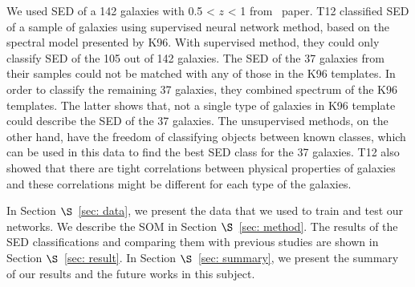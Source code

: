 We used SED of a 142 galaxies with 0.5 < $z$ < 1 from~\citet[][hereafter T12]{Hossein12} paper.
T12 classified SED of a sample of galaxies using supervised neural network method, based on the spectral model presented by K96.
With supervised method, they could only classify SED of the 105 out of 142 galaxies.
The SED of the 37 galaxies from their samples could not be matched with any of those in the K96 templates. 
In order to classify the remaining 37 galaxies, they combined spectrum of the K96 templates.
The latter shows that, not a single type of galaxies in K96 template could describe the SED of the 37 galaxies.
The unsupervised methods, on the other hand, have the freedom of classifying objects between known classes, which can be used in this data to find the best SED class for the 37 galaxies.
T12 also showed that there are tight correlations between physical properties of galaxies and these correlations might be different for each type of the galaxies.

 In Section $\S$~\ref{sec: data}, we present the data that we used to train and test our networks. We describe the SOM in Section $\S$~\ref{sec: method}. The results of the SED classifications and comparing them with previous studies are shown in Section $\S$~\ref{sec: result}. In Section $\S$~\ref{sec: summary}, we present the summary of our results and the future works in this subject.
